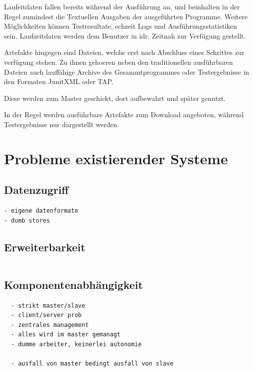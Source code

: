 Laufeitdaten fallen bereits w\"ahrend der Ausf\"uhrung an,
und beinhalten in der Regel zumindest die Textuellen Ausgaben
der ausgef\"uhrten Programme.
Weitere M\"oglichkeiten k\"onnen Testresultate, echzeit Logs und Ausf\"uhrungsstatistiken sein.
Laufzeitdaten werden dem Benutzer in idr. Zeitnah zur Verf\"ugung gestellt.

Artefakte hingegen sind Dateien,
welche erst nach Abschluss eines Schrittes zur verf\"ugung stehen.
Zu ihnen gehoeren neben den traditionellen ausf\"uhrbaren Dateien
auch lauff\"ahige Archive des Gesammtprogrammes oder Testergebnisse in den Formaten JunitXML oder TAP.


Diese werden zum Master geschickt, dort aufbewahrt und sp\"ater genutzt.

In der Regel werden ausf\"uhrbare Artefakte zum Download angeboten,
w\"ahrend Testergebnisse nur dargestellt werden.





\section{Probleme existierender Systeme}


\subsection{Datenzugriff}

\begin{verbatim}
- eigene datenformate
- dumb stores
\end{verbatim}

\subsection{Erweiterbarkeit}
\begin{verbatim}

\end{verbatim}


\subsection{Komponentenabh\"angigkeit}
\begin{verbatim}
  - strikt master/slave
  - client/server prob
  - zentrales management
  - alles wird im master gemanagt
  - dumme arbeiter, keinerlei autonomie

  - ausfall von master bedingt ausfall von slave


\end{verbatim}

